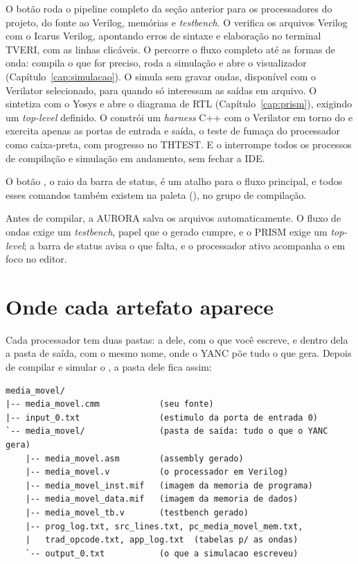 O botão  roda o pipeline completo da seção anterior para os processadores do projeto, do fonte ao Verilog, memórias e \textit{testbench}. O  verifica os arquivos Verilog com o Icarus Verilog, apontando erros de sintaxe e elaboração no terminal TVERI, com as linhas clicáveis. O  percorre o fluxo completo até as formas de onda: compila o que for preciso, roda a simulação e abre o visualizador (Capítulo~\ref{cap:simulacao}). O  simula sem gravar ondas, disponível com o Verilator selecionado, para quando só interessam as saídas em arquivo. O  sintetiza com o Yosys e abre o diagrama de RTL (Capítulo~\ref{cap:prism}), exigindo um \textit{top-level} definido. O  constrói um \textit{harness} C++ com o Verilator em torno do  e exercita apenas as portas de entrada e saída, o teste de fumaça do processador como caixa-preta, com progresso no THTEST. E o  interrompe todos os processos de compilação e simulação em andamento, sem fechar a IDE.

O botão , o raio da barra de status, é um atalho para o fluxo principal, e todos esses comandos também existem na paleta (), no grupo de compilação.

Antes de compilar, a AURORA salva os arquivos automaticamente. O fluxo de ondas exige um \textit{testbench}, papel que o  gerado cumpre, e o PRISM exige um \textit{top-level}; a barra de status avisa o que falta, e o processador ativo acompanha o  em foco no editor.

\section{Onde cada artefato aparece}

Cada processador tem duas pastas: a dele, com o que você escreve, e dentro dela a pasta de saída, com o mesmo nome, onde o YANC põe tudo o que gera. Depois de compilar e simular o , a pasta dele fica assim:

\begin{lstlisting}
media_movel/
|-- media_movel.cmm            (seu fonte)
|-- input_0.txt                (estimulo da porta de entrada 0)
`-- media_movel/               (pasta de saida: tudo o que o YANC gera)
    |-- media_movel.asm        (assembly gerado)
    |-- media_movel.v          (o processador em Verilog)
    |-- media_movel_inst.mif   (imagem da memoria de programa)
    |-- media_movel_data.mif   (imagem da memoria de dados)
    |-- media_movel_tb.v       (testbench gerado)
    |-- prog_log.txt, src_lines.txt, pc_media_movel_mem.txt,
    |   trad_opcode.txt, app_log.txt  (tabelas p/ as ondas)
    `-- output_0.txt           (o que a simulacao escreveu)
\end{lstlisting}

